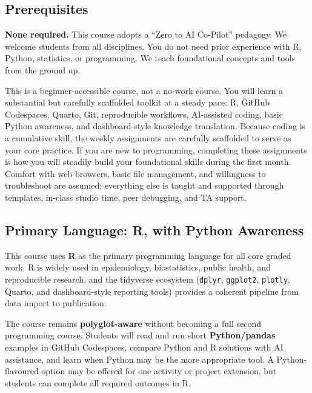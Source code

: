 \documentclass[
  letterpaper,
  DIV=11,
  numbers=noendperiod,
  oneside]{scrreprt}
\begin{document}
\subsection{Prerequisites}\label{prerequisites}

\textbf{None required.} This course adopts a ``Zero to AI Co-Pilot''
pedagogy. We welcome students from all disciplines. You do not need
prior experience with R, Python, statistics, or programming. We teach
foundational concepts and tools from the ground up.

\begin{tcolorbox}[colback=brandlight!5!white, colframe=brandblue, title=\textbf{What "no prerequisites" means in practice}, arc=2mm]
This is a beginner-accessible course, not a no-work course. You will learn a substantial but carefully scaffolded toolkit at a steady pace: R, GitHub Codespaces, Quarto, Git, reproducible workflows, AI-assisted coding, basic Python awareness, and dashboard-style knowledge translation. Because coding is a cumulative skill, the weekly assignments are carefully scaffolded to serve as your core practice. If you are new to programming, completing these assignments is how you will steadily build your foundational skills during the first month. Comfort with web browsers, basic file management, and willingness to troubleshoot are assumed; everything else is taught and supported through templates, in-class studio time, peer debugging, and TA support.
\end{tcolorbox}

\subsection{Primary Language: R, with Python
Awareness}\label{primary-language-r-with-python-awareness}

This course uses \textbf{R} as the primary programming language for all
core graded work. R is widely used in epidemiology, biostatistics,
public health, and reproducible research, and the tidyverse ecosystem
(\texttt{dplyr}, \texttt{ggplot2}, \texttt{plotly}, Quarto, and
dashboard-style reporting tools) provides a coherent pipeline from data
import to publication.

The course remains \textbf{polyglot-aware} without becoming a full
second programming course. Students will read and run short
\textbf{Python/pandas} examples in GitHub Codespaces, compare Python and
R solutions with AI assistance, and learn when Python may be the more
appropriate tool. A Python-flavoured option may be offered for one
activity or project extension, but students can complete all required
outcomes in R.
\end{document}
